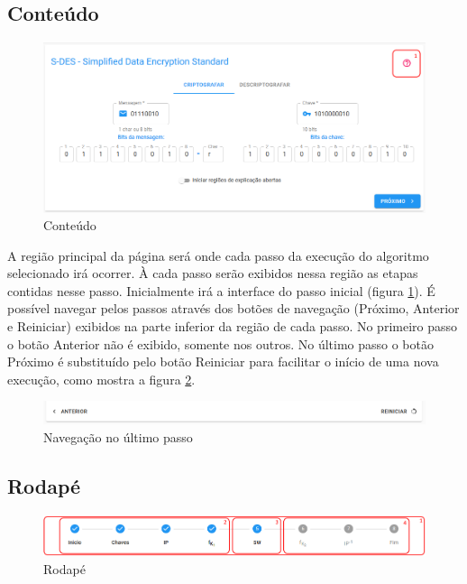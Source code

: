 \subsection{Conteúdo}

\begin{figure}[H]
    \centering
    \caption{Conteúdo}
    \label{fig:uimain}
    \includegraphics[width=1\linewidth]{UI/UIMain.png}
\end{figure}

A região principal da página será onde cada passo da execução do algoritmo selecionado irá ocorrer. À cada passo serão exibidos nessa região as etapas contidas nesse passo. Inicialmente irá a interface do passo inicial (figura \ref{fig:uimain}). É possível navegar pelos passos através dos botões de navegação (Próximo, Anterior e Reiniciar) exibidos na parte inferior da região de cada passo. No primeiro passo o botão Anterior não é exibido, somente nos outros. No último passo o botão Próximo é substituído pelo botão Reiniciar para facilitar o início de uma nova execução, como mostra a figura \ref{fig:uilastnav}.

\begin{figure}[H]
    \centering
    \caption{Navegação no último passo}
    \label{fig:uilastnav}
    \includegraphics[width=1\linewidth]{UI/UILastNavigation.png}
\end{figure}

\subsection{Rodapé}

\begin{figure}[H]
    \centering
    \caption{Rodapé}
    \label{fig:uifooter}
    \includegraphics[width=1\linewidth]{UI/UIFooter.png}
\end{figure}

